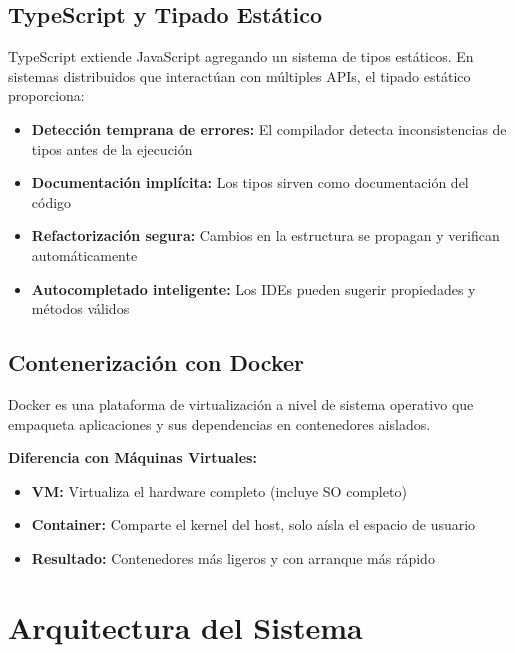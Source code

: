 \documentclass[12pt,a4paper]{article}
\begin{document}
\subsection{TypeScript y Tipado Estático}

TypeScript extiende JavaScript agregando un sistema de tipos estáticos. En sistemas distribuidos que interactúan con múltiples APIs, el tipado estático proporciona:

\begin{itemize}
    \item \textbf{Detección temprana de errores:} El compilador detecta inconsistencias de tipos antes de la ejecución
    \item \textbf{Documentación implícita:} Los tipos sirven como documentación del código
    \item \textbf{Refactorización segura:} Cambios en la estructura se propagan y verifican automáticamente
    \item \textbf{Autocompletado inteligente:} Los IDEs pueden sugerir propiedades y métodos válidos
\end{itemize}

\subsection{Contenerización con Docker}

Docker es una plataforma de virtualización a nivel de sistema operativo que empaqueta aplicaciones y sus dependencias en contenedores aislados.

\textbf{Diferencia con Máquinas Virtuales:}
\begin{itemize}
    \item \textbf{VM:} Virtualiza el hardware completo (incluye SO completo)
    \item \textbf{Container:} Comparte el kernel del host, solo aísla el espacio de usuario
    \item \textbf{Resultado:} Contenedores más ligeros y con arranque más rápido
\end{itemize}

\newpage

\section{Arquitectura del Sistema}
\end{document}
